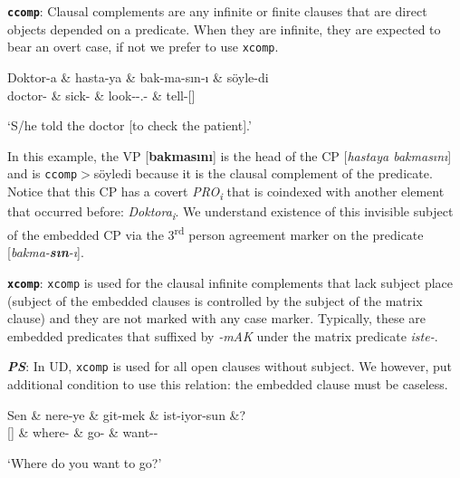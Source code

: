 \documentclass[11pt,a4paper]{article}
\begin{document}
\textbf{\texttt{ccomp}}:
Clausal complements are any infinite or finite clauses that are direct objects depended on a predicate. When they are infinite, they are expected to bear an overt case, if not we prefer to use \texttt{xcomp}.

\begin{exe}
\ex \label{csubj}
\begin{dependency}
\begin{deptext}[column sep=0.24cm]
Doktor-a \& hasta-ya \& bak-ma-sın-ı \& söyle-di \\
doctor-\Dat{} \& sick-\Dat{} \& look-\Nmlz{}-\Poss{}.\Tsg{}-\Acc{} \& tell-\Pst{}[\Tsg] \\
\end{deptext}
\end{dependency}
\glt `S/he told the doctor [to check the patient].'
\end{exe} 

In this example, the VP [\textbf{bakmasını}] is the head of the CP [\textit{hastaya bakmasını}] and is \texttt{ccomp}$>$söyledi because it is the clausal complement of the predicate. Notice that this CP has a covert \textit{PRO\textsubscript{i}} that is coindexed with another element that occurred before: \textit{Doktora\textsubscript{i}}. We understand existence of this invisible subject of the embedded CP via the 3\textsuperscript{rd} person agreement marker on the predicate [\textit{bakma-\textbf{sın}-ı}].

\textbf{\texttt{xcomp}}:
\texttt{xcomp} is used for the clausal infinite complements that lack subject place (subject of the embedded clauses is controlled by the subject of the matrix clause) and they are not marked with any case marker. Typically, these are embedded predicates that suffixed by \textit{-mAK} under the matrix predicate \textit{iste-}.

\textit{\textbf{PS}}: In UD, \texttt{xcomp} is used for all open clauses without subject. We however, put additional condition to use this relation: the embedded clause must be caseless.

\begin{exe}
\ex \label{xcomp}
\begin{dependency}
\begin{deptext}
Sen \& nere-ye \& git-mek \& ist-iyor-sun \&? \\
{\Ssg}[\Nom] \& where-\Dat{} \& go-\Inf{} \& want-\Prog{}-\Ssg{} \\
\end{deptext}
\end{dependency}
\glt `Where do you want to go?'
\end{exe} 
\end{document}
